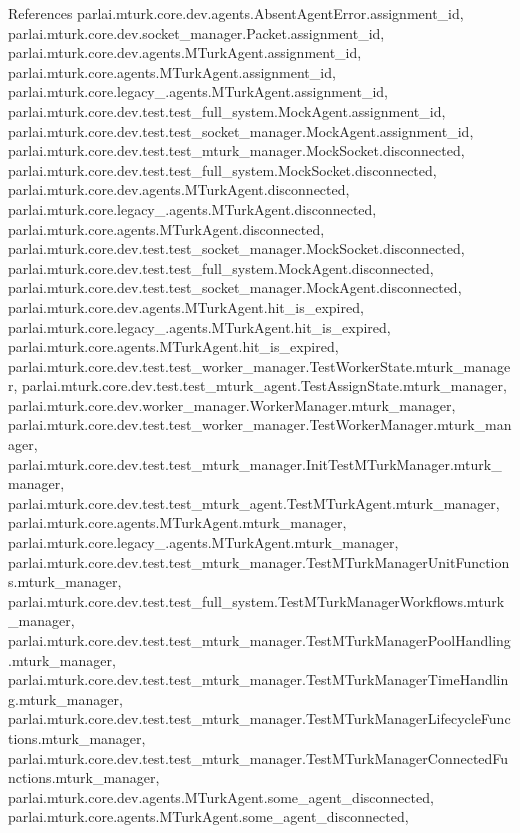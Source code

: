 References parlai.\+mturk.\+core.\+dev.\+agents.\+Absent\+Agent\+Error.\+assignment\+\_\+id, parlai.\+mturk.\+core.\+dev.\+socket\+\_\+manager.\+Packet.\+assignment\+\_\+id, parlai.\+mturk.\+core.\+dev.\+agents.\+M\+Turk\+Agent.\+assignment\+\_\+id, parlai.\+mturk.\+core.\+agents.\+M\+Turk\+Agent.\+assignment\+\_\+id, parlai.\+mturk.\+core.\+legacy\+\_.\+agents.\+M\+Turk\+Agent.\+assignment\+\_\+id, parlai.\+mturk.\+core.\+dev.\+test.\+test\+\_\+full\+\_\+system.\+Mock\+Agent.\+assignment\+\_\+id, parlai.\+mturk.\+core.\+dev.\+test.\+test\+\_\+socket\+\_\+manager.\+Mock\+Agent.\+assignment\+\_\+id, parlai.\+mturk.\+core.\+dev.\+test.\+test\+\_\+mturk\+\_\+manager.\+Mock\+Socket.\+disconnected, parlai.\+mturk.\+core.\+dev.\+test.\+test\+\_\+full\+\_\+system.\+Mock\+Socket.\+disconnected, parlai.\+mturk.\+core.\+dev.\+agents.\+M\+Turk\+Agent.\+disconnected, parlai.\+mturk.\+core.\+legacy\+\_.\+agents.\+M\+Turk\+Agent.\+disconnected, parlai.\+mturk.\+core.\+agents.\+M\+Turk\+Agent.\+disconnected, parlai.\+mturk.\+core.\+dev.\+test.\+test\+\_\+socket\+\_\+manager.\+Mock\+Socket.\+disconnected, parlai.\+mturk.\+core.\+dev.\+test.\+test\+\_\+full\+\_\+system.\+Mock\+Agent.\+disconnected, parlai.\+mturk.\+core.\+dev.\+test.\+test\+\_\+socket\+\_\+manager.\+Mock\+Agent.\+disconnected, parlai.\+mturk.\+core.\+dev.\+agents.\+M\+Turk\+Agent.\+hit\+\_\+is\+\_\+expired, parlai.\+mturk.\+core.\+legacy\+\_.\+agents.\+M\+Turk\+Agent.\+hit\+\_\+is\+\_\+expired, parlai.\+mturk.\+core.\+agents.\+M\+Turk\+Agent.\+hit\+\_\+is\+\_\+expired, parlai.\+mturk.\+core.\+dev.\+test.\+test\+\_\+worker\+\_\+manager.\+Test\+Worker\+State.\+mturk\+\_\+manager, parlai.\+mturk.\+core.\+dev.\+test.\+test\+\_\+mturk\+\_\+agent.\+Test\+Assign\+State.\+mturk\+\_\+manager, parlai.\+mturk.\+core.\+dev.\+worker\+\_\+manager.\+Worker\+Manager.\+mturk\+\_\+manager, parlai.\+mturk.\+core.\+dev.\+test.\+test\+\_\+worker\+\_\+manager.\+Test\+Worker\+Manager.\+mturk\+\_\+manager, parlai.\+mturk.\+core.\+dev.\+test.\+test\+\_\+mturk\+\_\+manager.\+Init\+Test\+M\+Turk\+Manager.\+mturk\+\_\+manager, parlai.\+mturk.\+core.\+dev.\+test.\+test\+\_\+mturk\+\_\+agent.\+Test\+M\+Turk\+Agent.\+mturk\+\_\+manager, parlai.\+mturk.\+core.\+agents.\+M\+Turk\+Agent.\+mturk\+\_\+manager, parlai.\+mturk.\+core.\+legacy\+\_.\+agents.\+M\+Turk\+Agent.\+mturk\+\_\+manager, parlai.\+mturk.\+core.\+dev.\+test.\+test\+\_\+mturk\+\_\+manager.\+Test\+M\+Turk\+Manager\+Unit\+Functions.\+mturk\+\_\+manager, parlai.\+mturk.\+core.\+dev.\+test.\+test\+\_\+full\+\_\+system.\+Test\+M\+Turk\+Manager\+Workflows.\+mturk\+\_\+manager, parlai.\+mturk.\+core.\+dev.\+test.\+test\+\_\+mturk\+\_\+manager.\+Test\+M\+Turk\+Manager\+Pool\+Handling.\+mturk\+\_\+manager, parlai.\+mturk.\+core.\+dev.\+test.\+test\+\_\+mturk\+\_\+manager.\+Test\+M\+Turk\+Manager\+Time\+Handling.\+mturk\+\_\+manager, parlai.\+mturk.\+core.\+dev.\+test.\+test\+\_\+mturk\+\_\+manager.\+Test\+M\+Turk\+Manager\+Lifecycle\+Functions.\+mturk\+\_\+manager, parlai.\+mturk.\+core.\+dev.\+test.\+test\+\_\+mturk\+\_\+manager.\+Test\+M\+Turk\+Manager\+Connected\+Functions.\+mturk\+\_\+manager, parlai.\+mturk.\+core.\+dev.\+agents.\+M\+Turk\+Agent.\+some\+\_\+agent\+\_\+disconnected, parlai.\+mturk.\+core.\+agents.\+M\+Turk\+Agent.\+some\+\_\+agent\+\_\+disconnected, 